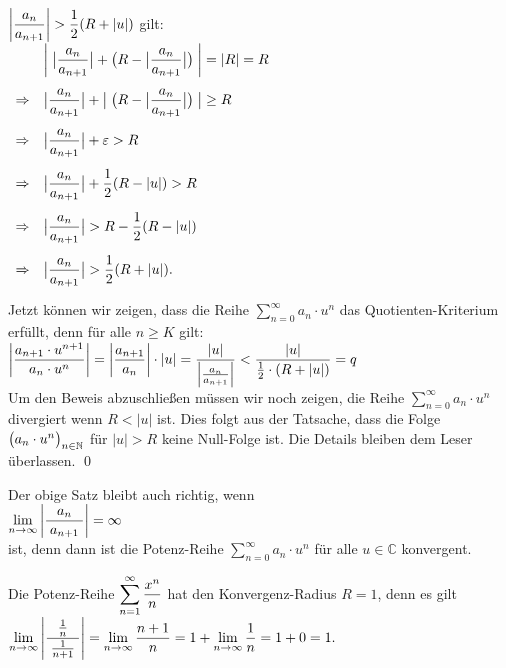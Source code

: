  $\displaystyle \left|\frac{a_{n}}{a_{n+1}}\right| > \frac{1}{2}(R + |u|)$ gilt:
\\[0.2cm]
\hspace*{1.3cm}
$
\begin{array}{cl}
 &\displaystyle \left|\;\bigl|\frac{a_{n}}{a_{n+1}}\bigr| + \bigl(R - \bigl|\frac{a_{n}}{a_{n+1}}\bigr|\bigr)\;\right| = |R| = R  \\[0.5cm]
\Rightarrow     & \displaystyle\bigl|\frac{a_{n}}{a_{n+1}}\bigr| + \bigl|\; \bigl(R - \bigl|\frac{a_{n}}{a_{n+1}}\bigr|\bigr)\;\bigr| \geq R  \\[0.5cm]
\Rightarrow     & \displaystyle\bigl|\frac{a_{n}}{a_{n+1}}\bigr| + \varepsilon > R  \\[0.5cm]
\Rightarrow     & \displaystyle\bigl|\frac{a_{n}}{a_{n+1}}\bigr| + \frac{1}{2}(R - |u|) > R  \\[0.5cm]
\Rightarrow     & \displaystyle\bigl|\frac{a_{n}}{a_{n+1}}\bigr|   > R - \frac{1}{2}(R - |u|)  \\[0.5cm]
\Rightarrow     & \displaystyle\bigl|\frac{a_{n}}{a_{n+1}}\bigr|   > \frac{1}{2}(R + |u|).  \\[0.5cm]
\end{array}
$
\\[0.2cm]
Jetzt k\"onnen wir zeigen, dass die Reihe $\sum\limits_{n=0}^\infty a_n\cdot u^n$ das
Quotienten-Kriterium erf\"ullt, denn f\"ur alle $n \geq K$ gilt:
\\[0.2cm]
\hspace*{1.3cm}
$\displaystyle \left|\frac{a_{n+1}\cdot u^{n+1}}{a_n\cdot u^n}\right| = 
   \left|\frac{a_{n+1}}{a_n}\right| \cdot  |u| = 
   \frac{|u|}{\left|\frac{a_{n}}{a_{n+1}}\right|} < 
   \frac{|u|}{\frac{1}{2}\cdot(R + |u|)} = q
$
\\[0.2cm]
Um den Beweis abzuschlie\ss{}en m\"ussen wir noch zeigen, die Reihe $\sum_{n=0}^\infty a_n\cdot u^n$
divergiert wenn  $R < |u|$ ist.   Dies folgt aus der Tatsache, dass die Folge
$\bigl(a_n\cdot u^n\bigr)_{n\in\mathbb{N}}$ f\"ur $|u|>R$ keine Null-Folge ist.  Die Details bleiben dem Leser
\"uberlassen. 
\qed 

\remark
Der obige Satz bleibt auch richtig, wenn
      \\[0.2cm]
      \hspace*{1.3cm}      
      $\displaystyle\lim\limits_{n\rightarrow\infty} \left|\frac{a_n}{\;a_{n+1}\;}\right| = \infty$
      \\[0.2cm]
ist, denn dann ist die Potenz-Reihe $\sum_{n=0}^\infty a_n\cdot u^n$ f\"ur alle $u\in\mathbb{C}$
konvergent.

\remark
Die Potenz-Reihe $\displaystyle\sum_{n=1}^\infty \frac{x^n}{n}$ hat den Konvergenz-Radius $R=1$, denn
es gilt 
\\[0.2cm]
\hspace*{1.3cm}
$\displaystyle
      \lim\limits_{n\rightarrow\infty} \left|\frac{\frac{1}{n}}{\;\frac{1}{n+1}\;}\right| = 
       \lim\limits_{n\rightarrow\infty} \frac{n+1}{n} = 
       1 + \lim\limits_{n\rightarrow\infty}  \frac{1}{n} = 1 + 0 = 1.
$  \eox



